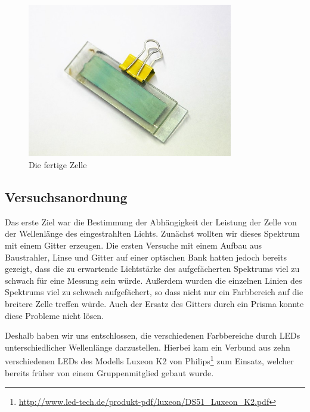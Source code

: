 \documentclass[11pt]{scrartcl}
\begin{document}
\begin{figure}[ht]
\begin{center}
\includegraphics[width=0.8\textwidth]{images/zelle_gruen.jpg}
\end{center}
\vspace{-1.5\baselineskip}
\caption{Die fertige Zelle}
\label{zelle_gruen.jpg}
\end{figure}



\subsection{Versuchsanordnung} %
Das erste Ziel war die Bestimmung der Abh\"angigkeit der Leistung der Zelle von der Wellenl\"ange des eingestrahlten Lichts. Zun\"achst wollten wir dieses Spektrum mit einem Gitter erzeugen. Die ersten Versuche mit einem Aufbau aus Baustrahler, Linse und Gitter auf einer optischen Bank hatten jedoch bereits gezeigt, dass die zu erwartende Lichtst\"arke des aufgef\"acherten Spektrums viel zu schwach f\"ur eine Messung sein w\"urde. Außerdem wurden die einzelnen Linien des Spektrums viel zu schwach aufgef\"achert, so dass nicht nur ein Farbbereich auf die breitere Zelle treffen w\"urde. Auch der Ersatz des Gitters durch ein Prisma konnte diese Probleme nicht l\"osen.

Deshalb haben wir uns entschlossen, die verschiedenen Farbbereiche durch LEDs unterschiedlicher Wellenl\"ange darzustellen. Hierbei kam ein Verbund aus zehn verschiedenen LEDs des Modells Luxeon K2 von Philips\footnote{\url{http://www.led-tech.de/produkt-pdf/luxeon/DS51\_Luxeon\_K2.pdf}} zum Einsatz, welcher bereits fr\"uher von einem Gruppenmitglied gebaut wurde.
\end{document}
